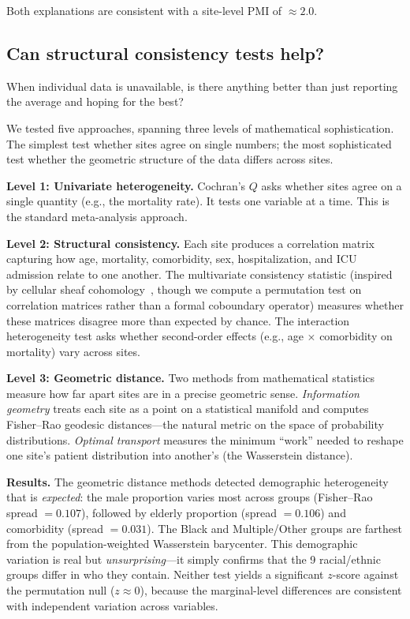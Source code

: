 \documentclass{article}
\begin{document}
Both explanations are consistent with a site-level PMI of $\approx 2.0$.


\subsection{Can structural consistency tests help?}

When individual data is unavailable, is there anything better than
just reporting the average and hoping for the best?

We tested five approaches, spanning three levels of mathematical
sophistication.  The simplest test whether sites agree on single numbers; the
most sophisticated test whether the geometric structure of the data differs
across sites.

\textbf{Level 1: Univariate heterogeneity.}  Cochran's $Q$ asks whether sites
agree on a single quantity (e.g., the mortality rate).  It tests one variable
at a time.  This is the standard meta-analysis approach.

\textbf{Level 2: Structural consistency.}  Each site produces a correlation
matrix capturing how age, mortality, comorbidity, sex, hospitalization, and ICU
admission relate to one another.  The multivariate consistency statistic
(inspired by cellular sheaf cohomology~\cite{robinson2017sheaf}, though we
compute a permutation test on correlation matrices rather than a formal
coboundary operator) measures whether these matrices disagree more than
expected by chance.  The interaction heterogeneity test asks whether
second-order effects (e.g., age $\times$ comorbidity on mortality) vary across
sites.

\textbf{Level 3: Geometric distance.}  Two methods from mathematical
statistics measure how far apart sites are in a precise geometric sense.
\emph{Information geometry} treats each site as a point on a statistical
manifold and computes Fisher--Rao geodesic distances---the natural metric on
the space of probability distributions.  \emph{Optimal transport} measures the
minimum ``work'' needed to reshape one site's patient distribution into
another's (the Wasserstein distance).

\textbf{Results.}  The geometric distance methods detected demographic
heterogeneity that is \emph{expected}: the male proportion varies most across
groups (Fisher--Rao spread $= 0.107$), followed by elderly proportion (spread
$= 0.106$) and comorbidity (spread $= 0.031$).  The Black and Multiple/Other
groups are farthest from the population-weighted Wasserstein barycenter.  This
demographic variation is real but \emph{unsurprising}---it simply confirms that
the 9 racial/ethnic groups differ in who they contain.  Neither test yields a
significant $z$-score against the permutation null ($z \approx 0$), because
the marginal-level differences are consistent with independent variation
across variables.
\end{document}
